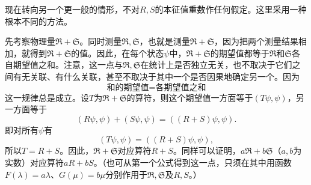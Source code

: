 \documentclass[fontsize=13pt,twoside,openany,headings=normal,parskip=false,bookmarkpackage=false,DIV=calc]{scrbook}
\begin{document}
现在转向另一个更一般的情形，不对$R,\allowbreak S$的本征值重数作任何假定。这里采用一种根本不同的方法。

先考察物理量$\mathfrak R+\mathfrak S$。同时测量$\mathfrak R,\allowbreak \mathfrak S$，也就是测量$\mathfrak R+\mathfrak S$，因为把两个测量结果相加，就得到$\mathfrak R+\mathfrak S$的值。因此，在每个状态$\psi$中，$\mathfrak R+\mathfrak S$的期望值都等于$\mathfrak R$和$\mathfrak S$各自期望值之和。注意，这一点与$\mathfrak R,\allowbreak \mathfrak S$在统计上是否独立无关，也不取决于它们之间有无关联、有什么关联，甚至不取决于其中一个是否因果地确定另一个。因为
\[
\text{和的期望值}=\text{各期望值之和}
\]
这一规律总是成立。设$T$为$\mathfrak R+\mathfrak S$的算符，则这个期望值一方面等于$(T\psi,\allowbreak \psi)$，另一方面等于
\[
(R\psi,\psi)+(S\psi,\psi)=((R+S)\psi,\psi).
\]
即对所有$\psi$有
\[
(T\psi,\psi)=((R+S)\psi,\psi),
\]
所以$T=R+S$。因此，$\mathfrak R+\mathfrak S$对应算符$R+S$。同样可以证明，$a\mathfrak R+b\mathfrak S$（$a,\allowbreak b$为实数）对应算符$aR+bS$。（也可从第一个公式得到这一点，只须在其中用函数$F(\lambda)=a\lambda$、$G(\mu)=b\mu$分别作用于$\mathfrak R,\allowbreak \mathfrak S$及$R,\allowbreak S$。）
\end{document}
